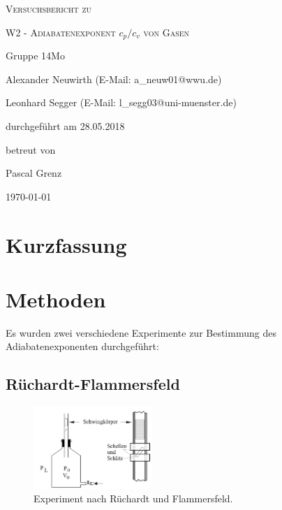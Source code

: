 \documentclass[
	a4paper,
	12pt,
	pagesize,
	ngerman
]{scrartcl}
\begin{document}
	
	\begin{titlepage}
		\centering
		{\scshape\LARGE Versuchsbericht zu \par}
		\vspace{1cm}
		{\scshape\huge W2 - Adiabatenexponent $c_p/c_v$ von Gasen \par} %
		\vspace{2.5cm}
		{\LARGE Gruppe 14Mo \par}
		\vspace{0.5cm}
		
		{\large Alexander Neuwirth (E-Mail: a\_neuw01@wwu.de) \par}
		{\large Leonhard Segger (E-Mail: l\_segg03@uni-muenster.de) \par}
		\vfill
		
		durchgeführt am 28.05.2018\par
		betreut von\par
		{\large Pascal Grenz}
		
		\vfill
		
		{\large \today\par}
	\end{titlepage}
	\tableofcontents
	\newpage


	\section{Kurzfassung}
	
	\section{Methoden} \label{sec_Methoden}
	Es wurden zwei verschiedene Experimente zur Bestimmung des Adiabatenexponenten durchgeführt:
	\subsection{Rüchardt-Flammersfeld}
	
	\begin{figure}[H]
		\includegraphics[width=0.4\textwidth]{flammer}
		\centering
		\caption{Experiment nach Rüchardt und Flammersfeld.}
		\label{aufbau_flammer}
		\centering
	\end{figure} 
\end{document}
